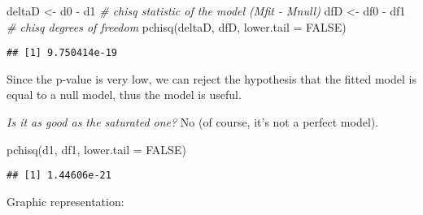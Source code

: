 \documentclass[
  oneside]{book}
\newenvironment{Shaded}{\begin{snugshade}}{\end{snugshade}}
\newcommand{\AttributeTok}[1]{\textcolor[rgb]{0.77,0.63,0.00}{#1}}
\newcommand{\CommentTok}[1]{\textcolor[rgb]{0.56,0.35,0.01}{\textit{#1}}}
\newcommand{\ConstantTok}[1]{\textcolor[rgb]{0.00,0.00,0.00}{#1}}
\newcommand{\FunctionTok}[1]{\textcolor[rgb]{0.00,0.00,0.00}{#1}}
\newcommand{\NormalTok}[1]{#1}
\newcommand{\OtherTok}[1]{\textcolor[rgb]{0.56,0.35,0.01}{#1}}
\newcommand{\SpecialCharTok}[1]{\textcolor[rgb]{0.00,0.00,0.00}{#1}}
\begin{document}
\begin{Shaded}
\end{Shaded}

\begin{Shaded}
\begin{Highlighting}[]
\NormalTok{deltaD }\OtherTok{\textless{}{-}}\NormalTok{ d0 }\SpecialCharTok{{-}}\NormalTok{ d1 }\CommentTok{\# chisq statistic of the model (Mfit {-} Mnull)}
\NormalTok{dfD }\OtherTok{\textless{}{-}}\NormalTok{ df0 }\SpecialCharTok{{-}}\NormalTok{ df1 }\CommentTok{\# chisq degrees of freedom}
\FunctionTok{pchisq}\NormalTok{(deltaD, dfD, }\AttributeTok{lower.tail =} \ConstantTok{FALSE}\NormalTok{)}
\end{Highlighting}
\end{Shaded}

\begin{verbatim}
## [1] 9.750414e-19
\end{verbatim}

Since the p-value is very low, we can reject the hypothesis
that the fitted model is equal to a null model, thus the
model is useful.

\emph{Is it as good as the saturated one?}
No (of course, it's not a perfect model).

\begin{Shaded}
\begin{Highlighting}[]
\FunctionTok{pchisq}\NormalTok{(d1, df1, }\AttributeTok{lower.tail =} \ConstantTok{FALSE}\NormalTok{)}
\end{Highlighting}
\end{Shaded}

\begin{verbatim}
## [1] 1.44606e-21
\end{verbatim}

Graphic representation:
\end{document}
